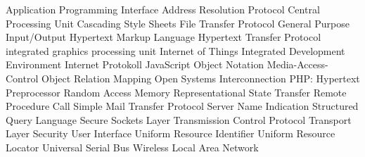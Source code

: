 \begin{acronym}[Bash]
  {Application Programming Interface}
  {Address Resolution Protocol}
  {Central Processing Unit}
  {Cascading Style Sheets}
  {File Transfer Protocol}
  {General Purpose Input/Output}
  {Hypertext Markup Language}
  {Hypertext Transfer Protocol}
  {integrated graphics processing unit}
  {Internet of Things}
  {Integrated Development Environment}
  {Internet Protokoll}
  {JavaScript Object Notation}
  {Media-Access-Control}
  {Object Relation Mapping}
  {Open Systems Interconnection}
  {PHP: Hypertext Preprocessor}
  {Random Access Memory}
  {Representational State Transfer}
  {Remote Procedure Call}
  {Simple Mail Transfer Protocol}
  {Server Name Indication}
  {Structured Query Language}
  {Secure Sockets Layer}
  {Transmission Control Protocol}
  {Transport Layer Security}
  {User Interface}
  {Uniform Resource Identifier}
  {Uniform Resource Locator}
  {Universal Serial Bus}
  {Wireless Local Area Network}
\end{acronym}

